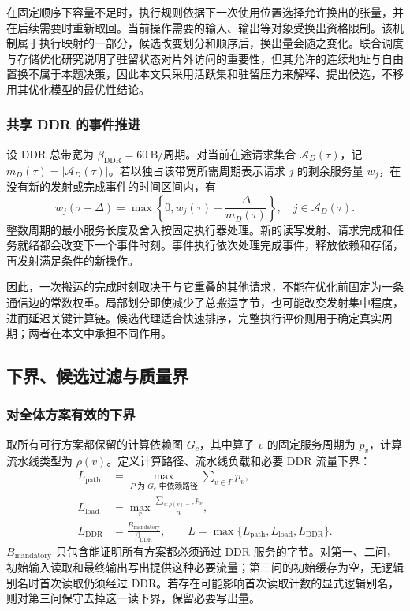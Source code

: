 在固定顺序下容量不足时，执行规则依据下一次使用位置选择允许换出的张量，并在后续需要时重新取回。当前操作需要的输入、输出等对象受换出资格限制。该机制属于执行映射的一部分，候选改变划分和顺序后，换出量会随之变化。联合调度与存储优化研究说明了驻留状态对片外访问的重要性\cite{A16}，但其允许的连续地址与自由置换不属于本题决策，因此本文只采用活跃集和驻留压力来解释、提出候选，不移用其优化模型的最优性结论。

\subsubsection{共享 DDR 的事件推进}
设 DDR 总带宽为 $\beta_{\mathrm{DDR}}=60\ \mathrm B/\text{周期}$。对当前在途请求集合 $\mathcal A_D(\tau)$，记 $m_D(\tau)=|\mathcal A_D(\tau)|$。若以独占该带宽所需周期表示请求 $j$ 的剩余服务量 $w_j$，在没有新的发射或完成事件的时间区间内，有
\begin{equation}
 w_j(\tau+\Delta)=\max\left\{0,w_j(\tau)-\frac{\Delta}{m_D(\tau)}\right\},\quad j\in\mathcal A_D(\tau).
 \label{eq:bandwidth}
\end{equation}
整数周期的最小服务长度及舍入按固定执行器处理。新的读写发射、请求完成和任务就绪都会改变下一个事件时刻。事件执行依次处理完成事件，释放依赖和存储，再发射满足条件的新操作。

因此，一次搬运的完成时刻取决于与它重叠的其他请求，不能在优化前固定为一条通信边的常数权重。局部划分即使减少了总搬运字节，也可能改变发射集中程度，进而延迟关键计算链。候选代理适合快速排序，完整执行评价则用于确定真实周期；两者在本文中承担不同作用。

\subsection{下界、候选过滤与质量界}
\subsubsection{对全体方案有效的下界}
取所有可行方案都保留的计算依赖图 $G_c$，其中算子 $v$ 的固定服务周期为 $p_v$，计算流水线类型为 $\rho(v)$。定义计算路径、流水线负载和必要 DDR 流量下界：
\begin{align}
 L_{\mathrm{path}}&=\max_{P\text{ 为 }G_c\text{ 中依赖路径}}\sum_{v\in P}p_v,\\
 L_{\mathrm{load}}&=\max_r\frac{\sum_{v:\rho(v)=r}p_v}{n},\\
 L_{\mathrm{DDR}}&=\frac{B_{\mathrm{mandatory}}}{\beta_{\mathrm{DDR}}},\qquad
 L=\max\{L_{\mathrm{path}},L_{\mathrm{load}},L_{\mathrm{DDR}}\}.
 \label{eq:lower}
\end{align}
$B_{\mathrm{mandatory}}$ 只包含能证明所有方案都必须通过 DDR 服务的字节。对第一、二问，初始输入读取和最终输出写出提供这种必要流量；第三问的初始缓存为空，无逻辑别名时首次读取仍须经过 DDR。若存在可能影响首次读取计数的显式逻辑别名，则对第三问保守去掉这一读下界，保留必要写出量。

